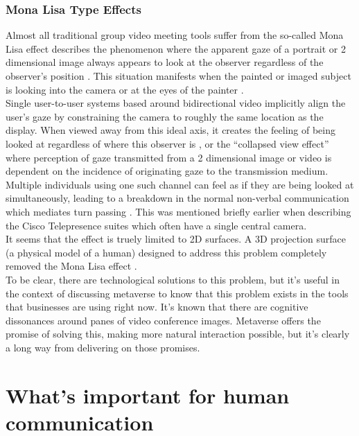\subsubsection{Mona Lisa Type Effects}
Almost all traditional group video meeting tools suffer from the so-called Mona Lisa effect describes the phenomenon where the apparent gaze of a portrait or 2 dimensional image always appears to look at the observer regardless of the observer's position \cite{Vishwanath2005, Anstis1969, Wollaston1824}. This situation manifests when the painted or imaged subject is looking into the camera or at the eyes of the painter \cite{Loomis2008, Fullwood2006}.\\
Single user-to-user systems based around bidirectional video implicitly align the user's gaze by constraining the camera to roughly the same location as the display. When viewed away from this ideal axis, it creates the feeling of being looked at regardless of where this observer is \cite{AlMoubayed2012, Vishwanath2005, Anstis1969, Wollaston1824}, or the ``collapsed view effect'' \cite{Nguyen2005} where perception of gaze transmitted from a 2 dimensional image or video is dependent on the incidence of originating gaze to the transmission medium. \\
Multiple individuals using one such channel can feel as if they are being looked at simultaneously, leading to a breakdown in the normal non-verbal communication which mediates turn passing \cite{Vertegaal2002}. This was mentioned briefly earlier when describing the Cisco Telepresence suites which often have a single central camera.\\
It seems that the effect is truely limited to 2D surfaces. A 3D projection surface (a physical model of a human) designed to address this problem completely removed the Mona Lisa effect \cite{Moubayed2012}.\\
To be clear, there are technological solutions to this problem, but it's useful in the context of discussing metaverse to know that this problem exists in the tools that businesses are using right now. It's known that there are cognitive dissonances around panes of video conference images. Metaverse offers the promise of solving this, making more natural interaction possible, but it's clearly a long way from delivering on those promises.

\section{What's important for human communication}
